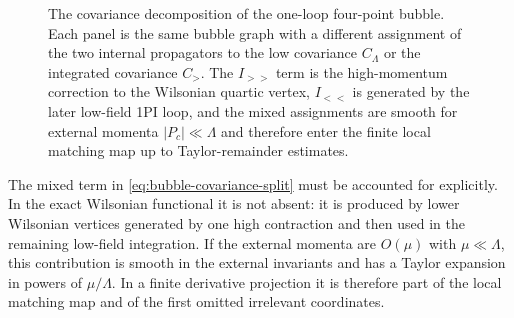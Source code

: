 \begin{figure}[H]
{
  }
  \caption{The covariance decomposition of the one-loop four-point bubble.
  Each panel is the same bubble graph with a different assignment of the two
  internal propagators to the low covariance \(C_\Lambda\) or the integrated
  covariance \(C_>\).  The \(I_{>>}\) term is the high-momentum correction to
  the Wilsonian quartic vertex, \(I_{<<}\) is generated by the later low-field
  1PI loop, and the mixed assignments are smooth for external momenta
  \(|P_c|\ll\Lambda\) and therefore enter the finite local matching map up to
  Taylor-remainder estimates.}
  \label{fig:quartic-one-loop-bphz-wilsonian-matching}
\end{figure}

The mixed term in \eqref{eq:bubble-covariance-split} must be accounted for
explicitly.  In the exact Wilsonian functional it is not absent: it is
produced by lower Wilsonian vertices generated by one high contraction and
then used in the remaining low-field integration.  If the external momenta are
\(O(\mu)\) with \(\mu\ll\Lambda\), this contribution is smooth in the
external invariants and has a Taylor expansion in powers of \(\mu/\Lambda\).
In a finite derivative projection it is therefore part of the local matching
map and of the first omitted irrelevant coordinates.

